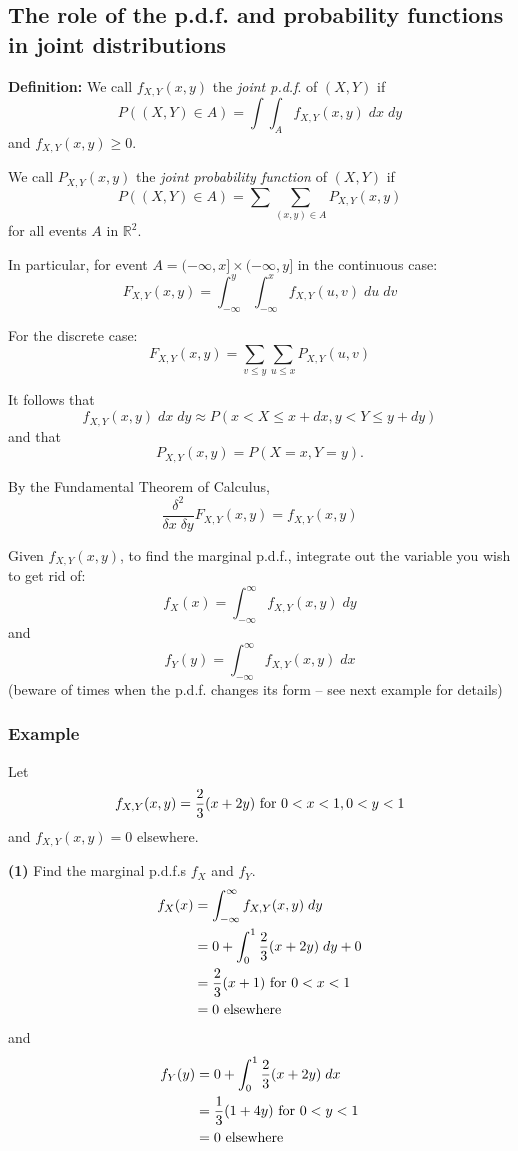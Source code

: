 \documentclass[12pt]{article}
\begin{document}
\subsection{The role of the p.d.f. and probability functions in joint distributions}

\textbf{Definition:} We call $f_{X,Y} (x,y)$ the \emph{joint p.d.f}. of $(X,Y)$ if 
\[
    P((X,Y) \in A) = \int \int_{A} f_{X,Y} (x,y) \; dx \; dy
\]
and $f_{X,Y} (x,y) \geq 0$.

We call $P_{X,Y} (x,y)$ the \emph{joint probability function} of $(X,Y)$ if
\[
    P((X,Y) \in A) = \sum \sum_{(x,y) \in A} P_{X,Y} (x,y)
\]
for all events $A$ in $\mathds{R}^2$.

In particular, for event $A = (-\infty, x] \times (-\infty, y]$ in the continuous case: %
\[
    F_{X,Y} (x,y) = \int_{-\infty}^y \int_{-\infty}^x f_{X,Y} (u,v) \; du \; dv
\]

For the discrete case:
\[
    F_{X,Y} (x,y) = \sum_{v \leq y} \sum_{u \leq x} P_{X,Y} (u,v)
\]

It follows that
\[
    f_{X,Y} (x,y) \; dx \; dy \approx P(x < X \leq x + dx, y < Y \leq y + dy)
\]
and that
\[
    P_{X,Y} (x,y) = P(X = x, Y = y).
\]

By the Fundamental Theorem of Calculus,
\[
    \frac{\delta^2}{\delta x \; \delta y} F_{X,Y} (x,y) = f_{X,Y} (x,y)
\]

Given $f_{X,Y} (x,y)$, to find the marginal p.d.f., integrate out the variable you wish to get rid of:
\[
    f_X (x) = \int_{-\infty}^{\infty} f_{X,Y} (x,y) \; dy
\]
and
\[
    f_Y (y) = \int_{-\infty}^{\infty} f_{X,Y} (x,y) \; dx
\]
(beware of times when the p.d.f. changes its form -- see next example for details)

\subsubsection{Example}
Let
\[
    f_{X,Y} (x,y) = \frac{2}{3} (x + 2y) \textnormal{ for } 0 < x < 1, 0 < y < 1
\]
and $f_{X,Y} (x,y) = 0$ elsewhere.

\textbf{(1)} Find the marginal p.d.f.s $f_X$ and $f_Y$.
\begin{align*}
    f_X (x) &= \int_{-\infty}^{\infty} f_{X,Y} (x,y) \; dy \\
        &= 0 + \int_0^1 \frac{2}{3} (x + 2y) \; dy + 0 \\
        &= \frac{2}{3} (x+1) \textnormal{ for } 0 < x < 1 \\
        &= 0 \textnormal{ elsewhere}
\end{align*}
and
\begin{align*}
    f_Y (y) &= 0 + \int_0^1 \frac{2}{3} (x + 2y) \; dx \\
        &= \frac{1}{3} (1 + 4y) \textnormal{ for } 0 < y < 1 \\
        &= 0 \textnormal{ elsewhere}
\end{align*}
\end{document}
